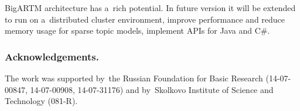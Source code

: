\documentclass{acm_proc_article-sp}
\begin{document}
\mbox{BigARTM} architecture has a~rich potential.
In future version it will be extended to run on a~distributed cluster environment,
improve performance and reduce memory usage for sparse topic models,
implement APIs for Java and C\#.

\bigskip
\subsubsection*{Acknowledgements.}
\nopagebreak
The work was supported by~the Russian Foundation for Basic Research (14-07-00847, 14-07-00908, 14-07-31176)
and by~Skolkovo Institute of Science and Technology (081-R).


%
%
\end{document}
